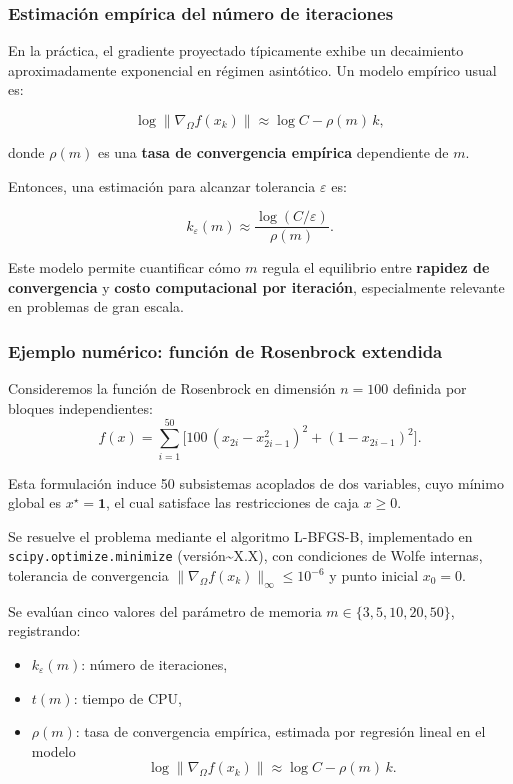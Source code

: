 \documentclass[
  spanish,
  us-letterpaper,
  DIV=11,
  numbers=noendperiod]{scrreprt}
\providecommand{\tightlist}{%
  \setlength{\itemsep}{0pt}\setlength{\parskip}{0pt}}
\numberwithin{equation}{section}
\begin{document}
\subsubsection{Estimación empírica del número de
iteraciones}\label{estimaciuxf3n-empuxedrica-del-nuxfamero-de-iteraciones}

En la práctica, el gradiente proyectado típicamente exhibe un
decaimiento aproximadamente exponencial en régimen asintótico. Un modelo
empírico usual es:

\[
\log \|\nabla_\Omega f(x_k)\| \approx \log C - \rho(m)\, k,
\]

donde \(\rho(m)\) es una \textbf{tasa de convergencia empírica}
dependiente de \(m\).

Entonces, una estimación para alcanzar tolerancia \(\varepsilon\) es:

\[
k_{\varepsilon}(m) \approx \frac{\log(C/\varepsilon)}{\rho(m)}.
\]

Este modelo permite cuantificar cómo \(m\) regula el equilibrio entre
\textbf{rapidez de convergencia} y \textbf{costo computacional por
iteración}, especialmente relevante en problemas de gran escala.

\subsubsection{Ejemplo numérico: función de Rosenbrock
extendida}\label{ejemplo-numuxe9rico-funciuxf3n-de-rosenbrock-extendida}

Consideremos la función de Rosenbrock en dimensión \(n=100\) definida
por bloques independientes: \[
f(x) = \sum_{i=1}^{50} \Big[ 100\,(x_{2i} - x_{2i-1}^2)^2 + (1 - x_{2i-1})^2 \Big].
\]

Esta formulación induce 50 subsistemas acoplados de dos variables, cuyo
mínimo global es \(x^\star = \mathbf{1}\), el cual satisface las
restricciones de caja \(x \ge 0\).

Se resuelve el problema mediante el algoritmo L-BFGS-B, implementado en
\texttt{scipy.optimize.minimize} (versión\textasciitilde X.X), con
condiciones de Wolfe internas, tolerancia de convergencia
\(\|\nabla_\Omega f(x_k)\|_\infty \le 10^{-6}\) y punto inicial
\(x_0 = 0\).

Se evalúan cinco valores del parámetro de memoria
\(m \in \{3, 5, 10, 20, 50\}\), registrando:

\begin{itemize}
\tightlist
\item
  \(k_{\varepsilon}(m)\): número de iteraciones,
\item
  \(t(m)\): tiempo de CPU,
\item
  \(\rho(m)\): tasa de convergencia empírica, estimada por regresión
  lineal en el modelo \[
    \log \|\nabla_\Omega f(x_k)\| \approx \log C - \rho(m)\, k.
    \]
\end{itemize}
\end{document}
